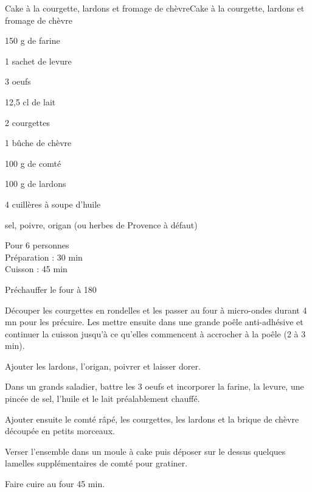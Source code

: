 \begin{recette}{Cake à la courgette, lardons et fromage de chèvre}{Cake à la courgette, lardons et fromage de chèvre}

\begin{ingredients}
150 g de farine\par
1 sachet de levure\par
3 oeufs\par
12,5 cl de lait\par
2 courgettes\par
1 bûche de chèvre\par
100 g de comté\par
100 g de lardons\par
4 cuillères à soupe d'huile\par
sel, poivre, origan (ou herbes de Provence à défaut)\par
\end{ingredients}

\begin{infos}
Pour 6 personnes\\
Préparation : 30 min\\
Cuisson : 45 min\\
\end{infos}

\begin{etapes}
\item Préchauffer le four à 180
\item Découper les courgettes en rondelles et les passer au four à micro-ondes durant 4 mn pour les précuire. Les mettre ensuite dans une grande poêle anti-adhésive et continuer la cuisson jusqu'à ce qu'elles commencent à accrocher à la poêle (2 à 3 min).
\item Ajouter les lardons, l'origan, poivrer et laisser dorer.
\item Dans un grands saladier, battre les 3 oeufs et incorporer la farine, la levure, une pincée de sel, l'huile et le lait préalablement chauffé.
\item Ajouter ensuite le comté râpé, les courgettes, les lardons et la brique de chèvre découpée en petits morceaux.
\item Verser l'ensemble dans un moule à cake puis déposer sur le dessus quelques lamelles supplémentaires de comté pour gratiner.
\item Faire cuire au four 45 min.
\end{etapes}

\end{recette}